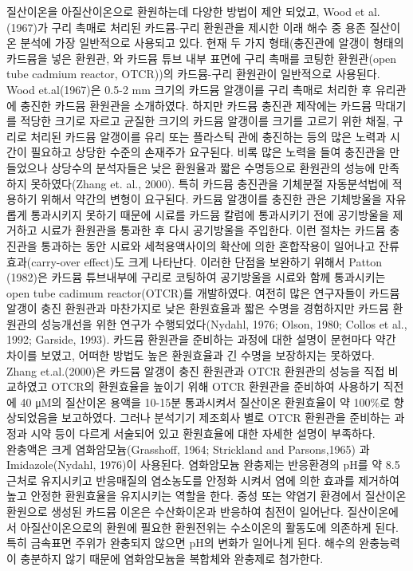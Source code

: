 \documentclass[
]{book}
\begin{document}
질산이온을 아질산이온으로 환원하는데 다양한 방법이 제안 되었고, Wood et al.(1967)가 구리 촉매로 처리된 카드뮴-구리 환원관을 제시한 이래 해수 중 용존 질산이온 분석에 가장 일반적으로 사용되고 있다. 현재 두 가지 형태(충진관에 알갱이 형태의 카드뮴을 넣은 환원관, 와 카드뮴 튜브 내부 표면에 구리 촉매를 코팅한 환원관(open tube cadmium reactor, OTCR))의 카드뮴-구리 환원관이 일반적으로 사용된다.
Wood et.al(1967)은 0.5-2 mm 크기의 카드뮴 알갱이를 구리 촉매로 처리한 후 유리관에 충진한 카드뮴 환원관을 소개하였다. 하지만 카드뮴 충진관 제작에는 카드뮴 막대기를 적당한 크기로 자르고 균질한 크기의 카드뮴 알갱이를 크기를 고르기 위한 채질, 구리로 처리된 카드뮴 알갱이를 유리 또는 플라스틱 관에 충진하는 등의 많은 노력과 시간이 필요하고 상당한 수준의 손재주가 요구된다. 비록 많은 노력을 들여 충진관을 만들었으나 상당수의 분석자들은 낮은 환원율과 짧은 수명등으로 환원관의 성능에 만족하지 못하였다(Zhang et. al., 2000).
특히 카드뮴 충진관을 기체분절 자동분석법에 적용하기 위해서 약간의 변형이 요구된다. 카드뮴 알갱이를 충진한 관은 기체방울을 자유롭게 통과시키지 못하기 때문에 시료를 카드뮴 칼럼에 통과시키기 전에 공기방울을 제거하고 시료가 환원관을 통과한 후 다시 공기방울을 주입한다. 이런 절차는 카드뮴 충진관을 통과하는 동안 시료와 세척용액사이의 확산에 의한 혼합작용이 일어나고 잔류효과(carry-over effect)도 크게 나타난다. 이러한 단점을 보완하기 위해서 Patton (1982)은 카드뮴 튜브내부에 구리로 코팅하여 공기방울을 시료와 함께 통과시키는 open tube cadimum reactor(OTCR)를 개발하였다. 여전히 많은 연구자들이 카드뮴 알갱이 충진 환원관과 마찬가지로 낮은 환원효율과 짧은 수명을 경험하지만 카드뮴 환원관의 성능개선을 위한 연구가 수행되었다(Nydahl, 1976; Olson, 1980; Collos et al., 1992; Garside, 1993). 카드뮴 환원관을 준비하는 과정에 대한 설명이 문헌마다 약간 차이를 보였고, 어떠한 방법도 높은 환원효율과 긴 수명을 보장하지는 못하였다. Zhang et.al.(2000)은 카드뮴 알갱이 충진 환원관과 OTCR 환원관의 성능을 직접 비교하였고 OTCR의 환원효율을 높이기 위해 OTCR 환원관을 준비하여 사용하기 직전에 40 μM의 질산이온 용액을 10-15분 통과시켜서 질산이온 환원효율이 약 100\%로 향상되었음을 보고하였다.
그러나 분석기기 제조회사 별로 OTCR 환원관을 준비하는 과정과 시약 등이 다르게 서술되어 있고 환원효율에 대한 자세한 설명이 부족하다.\\
완충액은 크게 염화암모늄(Grasshoff, 1964; Strickland and Parsons,1965) 과 Imidazole(Nydahl, 1976)이 사용된다. 염화암모늄 완충제는 반응환경의 pH를 약 8.5 근처로 유지시키고 반응매질의 염소농도를 안정화 시켜서 염에 의한 효과를 제거하여 높고 안정한 환원효율을 유지시키는 역할을 한다. 중성 또는 약염기 환경에서 질산이온 환원으로 생성된 카드뮴 이온은 수산화이온과 반응하여 침전이 일어난다. 질산이온에서 아질산이온으로의 환원에 필요한 환원전위는 수소이온의 활동도에 의존하게 된다. 특히 금속표면 주위가 완충되지 않으면 pH의 변화가 일어나게 된다. 해수의 완충능력이 충분하지 않기 때문에 염화암모늄을 복합체와 완충제로 첨가한다.
\end{document}
